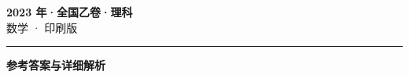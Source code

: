 \documentclass[zihao=5, a4paper]{ctexart}
\begin{document}
\begin{center}
  {\Large\bfseries 2023 年·全国乙卷·理科}\\[4pt]
  {\large 数学 · 印刷版}
\end{center}
\medskip
{}

\par\bigskip\hrule\bigskip
{}
\begin{center}{\large\bfseries 参考答案与详细解析}\end{center}
\smallskip

\end{document}
